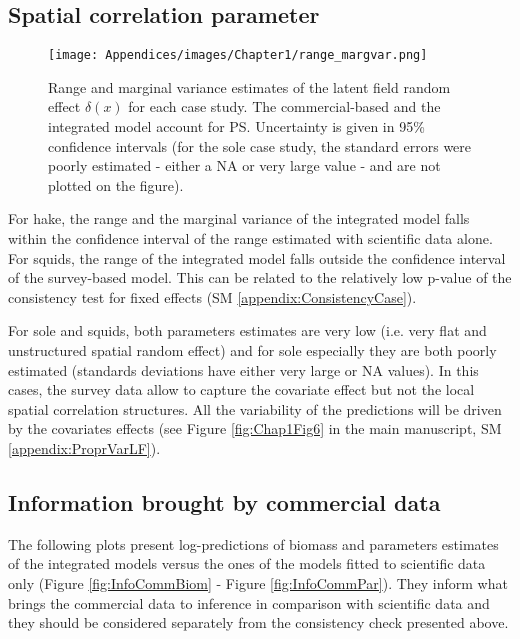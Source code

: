 \newpage

\subsection{Spatial correlation parameter}\label{appendix:RangeMargVar}

\begin{figure}[H]
   \begin{center}
      \texttt{[image: Appendices/images/Chapter1/range\_margvar.png]}
   \end{center}
   \caption[Range and marginal variance estimates of the latent field random effect \(\delta(x)\) for each case study.]
   {Range and marginal variance estimates of the latent field random effect \(\delta(x)\) for each case study. The commercial-based and the integrated model account for PS. Uncertainty is given in 95\% confidence intervals (for the sole case study, the standard errors were poorly estimated - either a NA or very large value - and are not plotted on the figure).}
   \label{fig:RangeMargVar}
\end{figure}

For hake, the range and the marginal variance of the integrated model falls within the confidence interval of the range estimated with scientific data alone. For squids, the range of the integrated model falls outside the confidence interval of the survey-based model. This can be related to the relatively low p-value of the consistency test for fixed effects (SM \ref{appendix:ConsistencyCase}).

For sole and squids, both parameters estimates are very low (i.e. very flat and unstructured spatial random effect) and for sole especially they are both poorly estimated (standards deviations have either very large or NA values). In this cases, the survey data allow to capture the covariate effect but not the local spatial correlation structures. All the variability of the predictions will be driven by the covariates effects (see Figure \ref{fig:Chap1Fig6} in the main manuscript, SM \ref{appendix:ProprVarLF}).

\newpage

\subsection{Information brought by commercial data}\label{appendix:InfoComm}

The following plots present log-predictions of biomass and parameters estimates of the integrated models versus the ones of the models fitted to scientific data only (Figure 
\ref{fig:InfoCommBiom} - Figure \ref{fig:InfoCommPar}). They inform what brings the commercial data to inference in comparison with scientific data and they should be considered separately from the consistency check presented above. 

